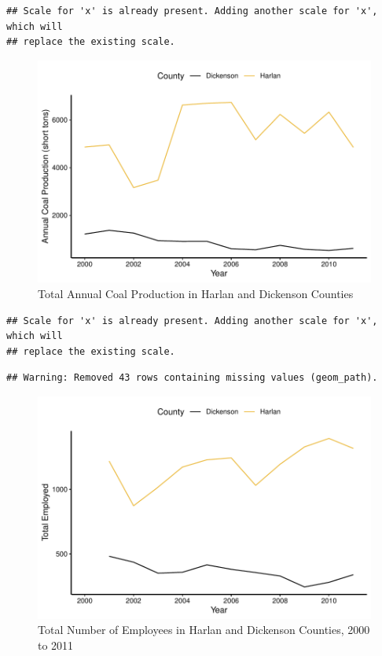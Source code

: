 \documentclass[12pt,]{article}
\begin{document}
\begin{verbatim}
## Scale for 'x' is already present. Adding another scale for 'x', which will
## replace the existing scale.
\end{verbatim}

\begin{figure}
\centering
\includegraphics{Smith_ENV872_Project_files/figure-latex/unnamed-chunk-7-1.pdf}
\caption{\label{fig:figs} Total Annual Coal Production in Harlan and
Dickenson Counties}
\end{figure}

\begin{verbatim}
## Scale for 'x' is already present. Adding another scale for 'x', which will
## replace the existing scale.
\end{verbatim}

\begin{verbatim}
## Warning: Removed 43 rows containing missing values (geom_path).
\end{verbatim}

\begin{figure}
\centering
\includegraphics{Smith_ENV872_Project_files/figure-latex/unnamed-chunk-8-1.pdf}
\caption{\label{fig:figs} Total Number of Employees in Harlan and
Dickenson Counties, 2000 to 2011}
\end{figure}
\end{document}
